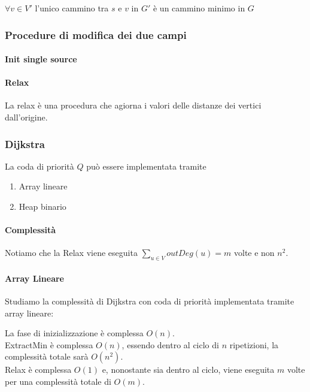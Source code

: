 {$\forall v \in V'$ l'unico cammino tra $s$ e $v$ in $G'$ è un cammino minimo in $G$}

\subsubsection{Procedure di modifica dei due campi}

\paragraph{Init single source}



\paragraph{Relax}

La relax è una procedura che agiorna i valori  delle distanze dei vertici dall'origine.





\subsubsection{Dijkstra}



{La coda di priorità $Q$ può essere implementata tramite}

\begin{enumerate}
\tightlist
\item
  {Array lineare}
\item
  {Heap binario}
\end{enumerate}

\paragraph{Complessità}

Notiamo che la Relax viene eseguita $\sum_{u \in V}{outDeg(u)} = m$ volte e non $n^2$.

\paragraph{Array Lineare}

{Studiamo la complessità di Dijkstra con coda di priorità implementata tramite array lineare:}

La fase di inizializzazione è complessa $O(n)$. \\
ExtractMin è complessa $O(n)$, essendo dentro al ciclo di $n$ ripetizioni, la complessità totale sarà $O(n^2)$. \\
Relax è complessa $O(1)$ e, nonostante sia dentro al ciclo, viene eseguita $m$ volte per una complessità totale di $O(m)$.


